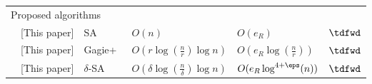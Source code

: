 \begin{minipage}{\textwidth}
\begin{tabular}{%
p{.5em}%
p{8em}%
p{7.5em}%
>{\centering}p{7em}%
>{\centering}p{8.5em}%
p{2.0em}%
}
\\
\multicolumn{6}{l}{Proposed algorithms} \\
& [This paper]	& SA\cite{manber:myers1993suffixarrays} & $O(n)$ & $O(e_R)$	& $\tdfwd$	 \\
& [This paper]   	& Gagie+~\cite{gagie:navarro:prezza2020fully}	 	& $O(r\log({\frac n r})\log n)$ & $O(e_R \log({\frac n r}))$& $\tdfwd$ \\
& [This paper]   	& $\delta$-SA~\cite{kempa:kociumaka2023collapsing}  & $O(\delta\log({\frac n \delta}) \log n)$	& $O(e_R \log^{4+\eps}(n))$	 & $\tdfwd$  \\
\bottomrule
\end{tabular}
\end{minipage}

